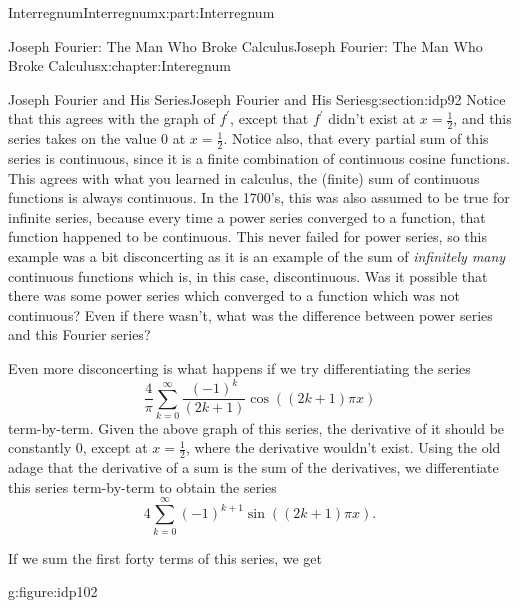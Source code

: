 \documentclass[oneside,10pt,]{book}
\numberwithin{equation}{section}
\begin{document}
\begin{partptx}{Interregnum}{}{Interregnum}{}{}{x:part:Interregnum}
\begin{chapterptx}{Joseph Fourier: The Man Who Broke Calculus}{}{Joseph Fourier: The Man Who Broke Calculus}{}{}{x:chapter:Interegnum}
\begin{sectionptx}{Joseph Fourier and His Series}{}{Joseph Fourier and His Series}{}{}{g:section:idp92}
Notice that this agrees with the graph of \(f^\prime\), except that \(f^\prime\) didn't exist at \(x=\frac{1}{2}\), and this series takes on the value \(0\) at \(x=\frac{1}{2}\). Notice also, that every partial sum of this series is continuous, since it is a finite combination of continuous cosine functions. This agrees with what you learned in calculus, the (finite) sum of continuous functions is always continuous. In the 1700's, this was also assumed to be true for infinite series, because every time a power series converged to a function, that function happened to be continuous. This never failed for power series, so this example was a bit disconcerting as it is an example of the sum of \emph{infinitely many} continuous functions which is, in this case, discontinuous. Was it possible that there was some power series which converged to a function which was not continuous? Even if there wasn't, what was the difference between power series and this Fourier series?%
\par
Even more disconcerting is what happens if we try differentiating the series%
\begin{equation*}
\frac{4}{\pi}\sum_{k=0}^\infty\frac{\left(-1\right)^k}{\left(2k+1\right)} \cos\left(\left(2k+1\right)\pi x\right)
\end{equation*}
term-by-term. Given the above graph of this series, the derivative of it should be constantly 0, except at \(x=\frac{1}{2}\), where the derivative wouldn't exist. Using the old adage that the derivative of a sum is the sum of the derivatives, we differentiate this series term-by-term to obtain the series%
\begin{equation*}
4\sum_{k=0}^\infty\left(-1\right)^{k+1}\sin\left(\left(2k+1\right)\pi x\right)\text{.}
\end{equation*}
%
\par
If we sum the first forty terms of this series, we get \begin{figureptx}{}{g:figure:idp102}{}%
\centering
\begin{image}{0}{1}{0}%

\end{image}
\end{figureptx}
\end{sectionptx}
\end{chapterptx}
\end{partptx}
\end{document}
